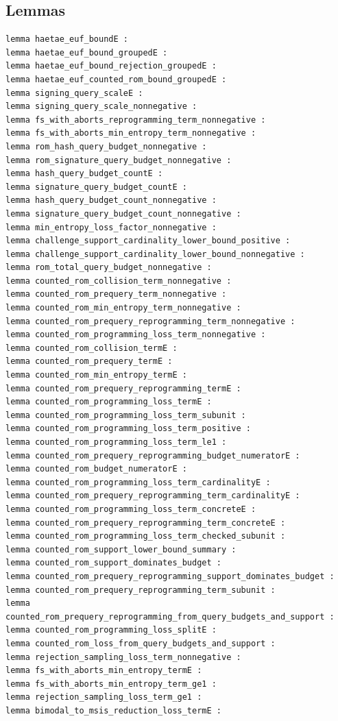 \subsection*{Lemmas}
\begin{lstlisting}[language=EasyCrypt,basicstyle=\ttfamily\tiny]
lemma haetae_euf_boundE :
lemma haetae_euf_bound_groupedE :
lemma haetae_euf_bound_rejection_groupedE :
lemma haetae_euf_counted_rom_bound_groupedE :
lemma signing_query_scaleE :
lemma signing_query_scale_nonnegative :
lemma fs_with_aborts_reprogramming_term_nonnegative :
lemma fs_with_aborts_min_entropy_term_nonnegative :
lemma rom_hash_query_budget_nonnegative :
lemma rom_signature_query_budget_nonnegative :
lemma hash_query_budget_countE :
lemma signature_query_budget_countE :
lemma hash_query_budget_count_nonnegative :
lemma signature_query_budget_count_nonnegative :
lemma min_entropy_loss_factor_nonnegative :
lemma challenge_support_cardinality_lower_bound_positive :
lemma challenge_support_cardinality_lower_bound_nonnegative :
lemma rom_total_query_budget_nonnegative :
lemma counted_rom_collision_term_nonnegative :
lemma counted_rom_prequery_term_nonnegative :
lemma counted_rom_min_entropy_term_nonnegative :
lemma counted_rom_prequery_reprogramming_term_nonnegative :
lemma counted_rom_programming_loss_term_nonnegative :
lemma counted_rom_collision_termE :
lemma counted_rom_prequery_termE :
lemma counted_rom_min_entropy_termE :
lemma counted_rom_prequery_reprogramming_termE :
lemma counted_rom_programming_loss_termE :
lemma counted_rom_programming_loss_term_subunit :
lemma counted_rom_programming_loss_term_positive :
lemma counted_rom_programming_loss_term_le1 :
lemma counted_rom_prequery_reprogramming_budget_numeratorE :
lemma counted_rom_budget_numeratorE :
lemma counted_rom_programming_loss_term_cardinalityE :
lemma counted_rom_prequery_reprogramming_term_cardinalityE :
lemma counted_rom_programming_loss_term_concreteE :
lemma counted_rom_prequery_reprogramming_term_concreteE :
lemma counted_rom_programming_loss_term_checked_subunit :
lemma counted_rom_support_lower_bound_summary :
lemma counted_rom_support_dominates_budget :
lemma counted_rom_prequery_reprogramming_support_dominates_budget :
lemma counted_rom_prequery_reprogramming_term_subunit :
lemma counted_rom_prequery_reprogramming_from_query_budgets_and_support :
lemma counted_rom_programming_loss_splitE :
lemma counted_rom_loss_from_query_budgets_and_support :
lemma rejection_sampling_loss_term_nonnegative :
lemma fs_with_aborts_min_entropy_termE :
lemma fs_with_aborts_min_entropy_term_ge1 :
lemma rejection_sampling_loss_term_ge1 :
lemma bimodal_to_msis_reduction_loss_termE :
\end{lstlisting}

